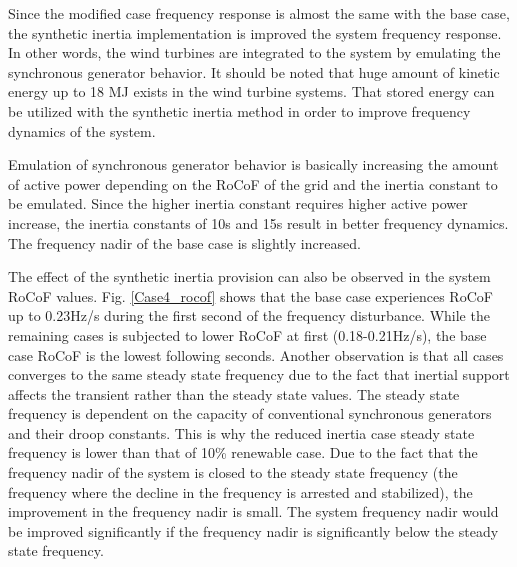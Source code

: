 Since the modified case frequency response is almost the same with the base case, the synthetic inertia implementation is improved the system frequency response. In other words, the wind turbines are integrated to the system by emulating the synchronous generator behavior. It should be noted that huge amount of kinetic energy up to 18 MJ exists in the wind turbine systems. That stored energy can be utilized with the synthetic inertia method in order to improve frequency dynamics of the system. \par
Emulation of synchronous generator behavior is basically increasing the amount of active power depending on the RoCoF of the grid and the inertia constant to be emulated. Since the higher inertia constant requires higher active power increase, the inertia constants of 10s and 15s result in better frequency dynamics. The frequency nadir of the base case is slightly increased. \par
The effect of the synthetic inertia provision can also be observed in the system RoCoF values. Fig. \ref{Case4_rocof} shows that the base case experiences RoCoF up to 0.23Hz/s during the first second of the frequency disturbance. While the remaining cases is subjected to lower RoCoF at first (0.18-0.21Hz/s), the base case RoCoF is the lowest following seconds. Another observation is that all cases converges to the same steady state frequency due to the fact that inertial support affects the transient rather than the steady state values. The steady state frequency is dependent on the capacity of conventional synchronous generators and their droop constants. This is why the reduced inertia case steady state frequency is lower than that of 10\% renewable case. Due to the fact that the frequency nadir of the system is closed to the steady state frequency (the frequency where the decline in the frequency is arrested and stabilized), the improvement in the frequency nadir is small. The system frequency nadir would be improved significantly if the frequency nadir is significantly below the steady state frequency. 
